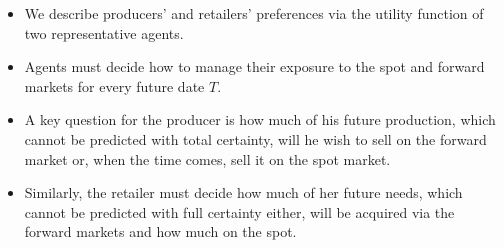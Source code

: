 {{{\begin{itemize}
\item<1-> We describe producers' and retailers'
preferences via the utility function of two representative agents.
\item<2-> Agents
must decide how to manage their exposure to the spot and forward
markets for every future date $T$.
\item<3->
A key question for the producer
is how much of his future production, which cannot be predicted with
total certainty, will he wish to sell on the forward market or, when
the time comes, sell it on the spot market.
\item<4-> Similarly, the retailer
must decide how much of her future needs, which cannot be predicted
with full certainty either, will be acquired via the forward markets
and how much on the spot.
\end{itemize}


}}}
